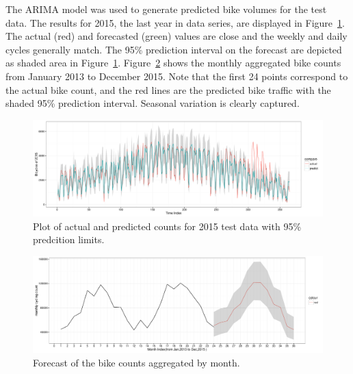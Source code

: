 \documentclass [11pt, proquest] {uwthesis}[2015/03/03]
\begin{document}
The ARIMA model was used to generate predicted bike volumes for the test data. The results for 2015, the last year in data series, are displayed in Figure~\ref{fig:arimapredict}. The actual (red) and forecasted (green) values are close and the weekly and daily cycles generally match. The 95\% prediction interval on the forecast are depicted as shaded area in Figure~\ref{fig:arimapredict}. Figure~\ref{fig:arimamonth} shows the monthly aggregated bike counts from January 2013 to December 2015. Note that the first 24 points correspond to the actual bike count, and the red lines are the predicted bike traffic with the shaded 95\% prediction interval. Seasonal variation is clearly captured.

\begin{figure}
   \includegraphics[width=1\textwidth]{figures/prediction/predbytime_arima} 
  \caption{Plot of actual and predicted counts for 2015 test data with 95\% predcition limits.}
  \label{fig:arimapredict}
\end{figure}

\begin{figure}
   \includegraphics[width=1\textwidth]{figures/prediction/pred_month} 
  \caption{Forecast of the bike counts aggregated by month.}
  \label{fig:arimamonth}
\end{figure}
\end{document}
